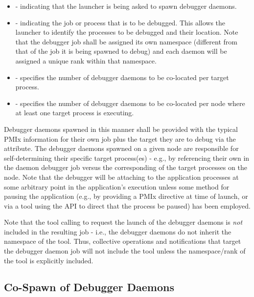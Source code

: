 \begin{itemize}
    \item {} - indicating that the launcher is
    being asked to spawn debugger daemons.
    \item {} - indicating the job or process that is
    to be debugged. This allows the launcher to identify the processes to be
    debugged and their location. Note that the debugger job shall be assigned
    its own namespace (different from that of the job it is being spawned
    to debug) and each daemon will be assigned a unique rank within that
    namespace.
    \item {} - specifies the number of
    debugger daemons to be co-located per target process.
    \item {} - specifies the number of
    debugger daemons to be co-located per node where at least one target
    process is executing.
\end{itemize}

Debugger daemons spawned in this manner shall be provided with the typical
\ac{PMIx} information for their own job plus the target they are to debug via
the  attribute. The debugger daemons spawned on a
given node are responsible for self-determining their specific target
process(es) - e.g., by referencing their own  in the
daemon debugger job versus the corresponding  of the
target processes on the node. Note that the debugger will be attaching to the application processes
at some arbitrary point in the application's execution unless some method for pausing the application
(e.g., by providing a \ac{PMIx} directive at time of launch, or via a tool using the
 \ac{API} to direct that the process be paused) has been employed.

\adviceuserstart
Note that the tool calling  to request the launch of the debugger daemons is \emph{not} included in the resulting job - i.e., the debugger daemons do not inherit the namespace of the tool. Thus, collective operations and notifications that target the debugger daemon job will not include the tool unless the namespace/rank of the tool is explicitly included.
\adviceuserend

\subsection{Co-Spawn of Debugger Daemons}
\label{chap:api_tools:cospawn}


